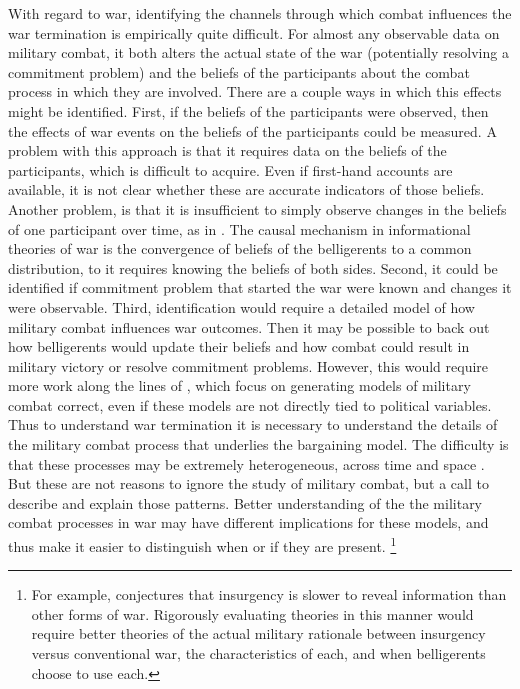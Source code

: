 With regard to war, identifying the channels through which combat influences the war termination is empirically quite difficult.
For almost any observable data on military combat, it both alters the actual state of the war (potentially resolving a commitment problem) and the beliefs of the participants about the combat process in which they are involved.
There are a couple ways in which this effects might be identified. %
First, if the beliefs of the participants were observed, then the effects of war events on the beliefs of the participants could be measured. %
A problem with this approach is that it requires data on the beliefs of the participants, which is difficult to acquire.
Even if first-hand accounts are available, it is not clear whether these are accurate indicators of those beliefs. %
Another problem, is that it is insufficient to simply observe changes in the beliefs of one participant over time, as in \textcite{Reiter2009}. %
The causal mechanism in informational theories of war is the convergence of beliefs of the belligerents to a common distribution, to it requires knowing the beliefs of both sides.
Second, it could be identified if commitment problem that started the war were known and changes it were observable. 
Third, identification would require a detailed model of how military combat influences war outcomes.
Then it may be possible to back out how belligerents would update their beliefs and how combat could result in military victory or resolve commitment problems.
However, this would require more work along the lines of \textcite{Biddle2004}, which focus on generating models of military combat correct, even if these models are not directly tied to political variables.
Thus to understand war termination it is necessary to understand the details of the military combat process that underlies the bargaining model. %
The difficulty is that these processes may be extremely heterogeneous, across time and space \parencite{Reiter2003}.
But these are not reasons to ignore the study of military combat, but a call to describe and explain those patterns.
Better understanding of the the military combat processes in war may have different implications for these models, and thus make it easier to distinguish when or if they are present.%
\footnote{%
  For example, \textcite{Walter2009} conjectures that insurgency is slower to reveal information than other forms of war. %
  Rigorously evaluating theories in this manner would require better theories of the actual military rationale between insurgency versus conventional war, the characteristics of each, and when belligerents choose to use each.
} %



